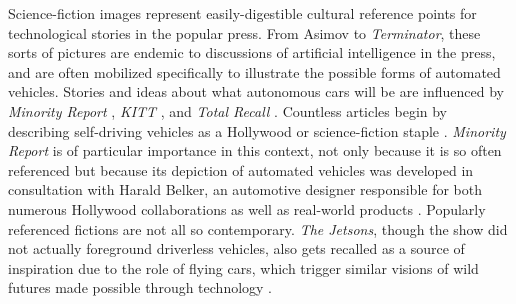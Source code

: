

Science-fiction images represent easily-digestible
cultural reference 
points for technological stories in the popular press. From Asimov to
\emph{Terminator}, 
these sorts of pictures are endemic to discussions of artificial
intelligence in the press, and are often mobilized specifically to
illustrate the possible forms of automated vehicles. Stories and ideas
about what autonomous cars will be are
influenced by \emph{Minority Report} \cite{fromHollywood}, \emph{KITT}
\cite{wadeKITT}, and \emph{Total
  Recall} \cite{pasdirtzSolution}. Countless articles begin by describing
self-driving vehicles as a Hollywood or science-fiction
staple \cite{scifiToReality}. \emph{Minority Report} is of particular
importance in this context, not only because it is so often referenced
but because its depiction of automated vehicles was developed in
consultation with Harald Belker, an automotive designer responsible
for both numerous Hollywood collaborations as well as real-world
products \cite{melansonMinority}. Popularly referenced fictions are
not all so contemporary. \emph{The Jetsons}, though
the show did not actually foreground driverless vehicles, also gets
recalled as a source of inspiration due to the role of flying cars,
which trigger similar visions of wild 
futures made possible through technology \cite{JetsonsAge}. 

